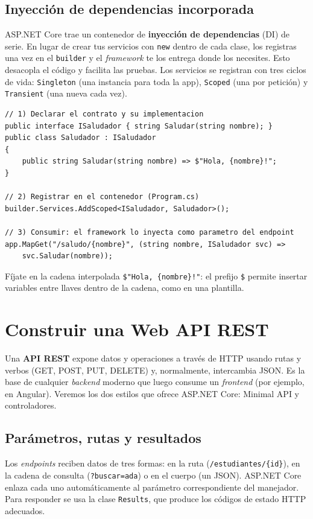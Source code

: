 \documentclass[11pt]{article}
\begin{document}
\subsection{Inyección de dependencias incorporada}
ASP.NET Core trae un contenedor de \textbf{inyección de dependencias} (DI) de serie. En lugar de crear tus servicios con \texttt{new} dentro de cada clase, los registras una vez en el \texttt{builder} y el \emph{framework} te los entrega donde los necesites. Esto desacopla el código y facilita las pruebas. Los servicios se registran con tres ciclos de vida: \texttt{Singleton} (una instancia para toda la app), \texttt{Scoped} (una por petición) y \texttt{Transient} (una nueva cada vez).

\begin{cajacodigo}
\begin{lstlisting}[style=cs]
// 1) Declarar el contrato y su implementacion
public interface ISaludador { string Saludar(string nombre); }
public class Saludador : ISaludador
{
    public string Saludar(string nombre) => $"Hola, {nombre}!";
}

// 2) Registrar en el contenedor (Program.cs)
builder.Services.AddScoped<ISaludador, Saludador>();

// 3) Consumir: el framework lo inyecta como parametro del endpoint
app.MapGet("/saludo/{nombre}", (string nombre, ISaludador svc) =>
    svc.Saludar(nombre));
\end{lstlisting}
\end{cajacodigo}
\vspace{2pt}
Fíjate en la cadena interpolada \texttt{\$"Hola, \{nombre\}!"}: el prefijo \texttt{\$} permite insertar variables entre llaves dentro de la cadena, como en una plantilla.

\section{Construir una Web API REST}
Una \textbf{API REST} expone datos y operaciones a través de HTTP usando rutas y verbos (GET, POST, PUT, DELETE) y, normalmente, intercambia JSON. Es la base de cualquier \emph{backend} moderno que luego consume un \emph{frontend} (por ejemplo, en Angular). Veremos los dos estilos que ofrece ASP.NET Core: Minimal API y controladores.

\subsection{Parámetros, rutas y resultados}
Los \emph{endpoints} reciben datos de tres formas: en la ruta (\texttt{/estudiantes/\{id\}}), en la cadena de consulta (\texttt{?buscar=ada}) o en el cuerpo (un JSON). ASP.NET Core enlaza cada uno automáticamente al parámetro correspondiente del manejador. Para responder se usa la clase \texttt{Results}, que produce los códigos de estado HTTP adecuados.
\end{document}
